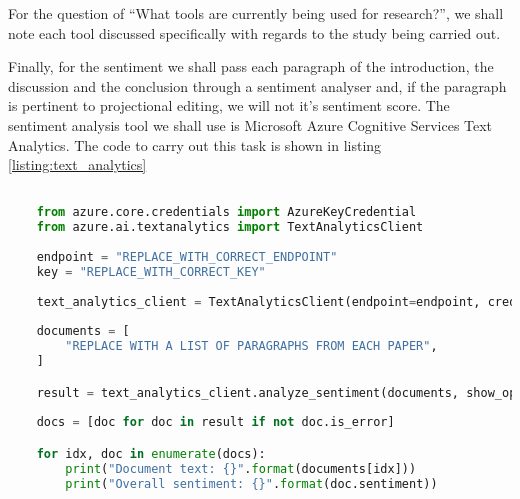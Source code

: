 For the question of ``What tools are currently being used for research?'', we shall note each tool discussed specifically with regards to the study being carried out.

Finally, for the sentiment we shall pass each paragraph of the introduction, the discussion and the conclusion through a sentiment analyser and, if the paragraph is pertinent to projectional editing, we will not it's sentiment score.  
The sentiment analysis tool we shall use is Microsoft Azure Cognitive Services Text Analytics.
The code to carry out this task is shown in listing \ref{listing:text_analytics}

\begin{lstlisting}[language={Python}, caption=Text Analytics code., captionpos=b, label=listing:text_analytics, breaklines=true]

    from azure.core.credentials import AzureKeyCredential
    from azure.ai.textanalytics import TextAnalyticsClient
    
    endpoint = "REPLACE_WITH_CORRECT_ENDPOINT"
    key = "REPLACE_WITH_CORRECT_KEY"
    
    text_analytics_client = TextAnalyticsClient(endpoint=endpoint, credential=AzureKeyCredential(key))
    
    documents = [
        "REPLACE WITH A LIST OF PARAGRAPHS FROM EACH PAPER",
    ]

    result = text_analytics_client.analyze_sentiment(documents, show_opinion_mining=True)
    
    docs = [doc for doc in result if not doc.is_error]

    for idx, doc in enumerate(docs):
        print("Document text: {}".format(documents[idx]))
        print("Overall sentiment: {}".format(doc.sentiment))
\end{lstlisting}



